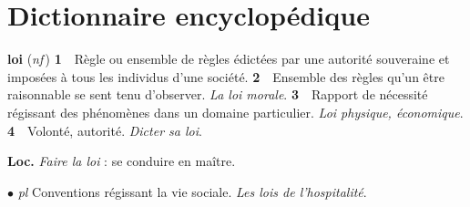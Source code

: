 
\section{Dictionnaire encyclopédique}

{\bf loi} ({\it nf}\,) {\bf 1}\ \ Règle ou ensemble de règles édictées
par une autorité souveraine et imposées à tous
les individus d’une société.
 {\bf 2}\ \ Ensemble des
règles qu'un être raisonnable se sent tenu
d'observer. {\it La loi morale}.
 {\bf 3}\ \ Rapport de nécessité régissant des phénomènes dans un
domaine particulier. {\it Loi physique, économique}.
 {\bf 4}\ \ Volonté, autorité. {\it Dicter sa loi}.

{\bf Loc.} {\it Faire la loi} : se conduire en maître.

$\bullet$ {\it pl} Conventions
régissant la vie sociale. {\it Les lois de l'hospitalité}.
